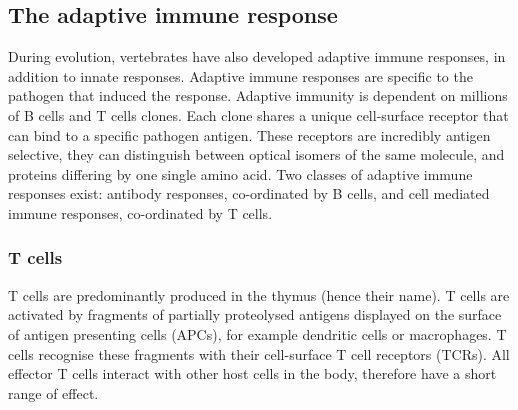 \subsection{The adaptive immune response}
During evolution, vertebrates have also developed adaptive immune responses, in addition to innate responses\cite{hoffmann2013innate}.
Adaptive immune responses are specific to the pathogen that induced the response.
Adaptive immunity is dependent on millions of B cells and T cells clones.
Each clone shares a unique cell-surface receptor that can bind to a specific pathogen antigen.
These receptors are incredibly antigen selective, they can distinguish between optical isomers of the same molecule, and proteins differing by one single amino acid.
Two classes of adaptive immune responses exist: antibody responses, co-ordinated by B cells, and cell mediated immune responses, co-ordinated by T cells\cite{alberts2007molecularimmune}.
%
\subsubsection{T cells}
T cells are predominantly produced in the thymus (hence their name).
T cells are activated by fragments of partially proteolysed antigens displayed on the surface of antigen presenting cells (APCs), for example dendritic cells or macrophages.
T cells recognise these fragments with their cell-surface T cell receptors (TCRs)\@.
All effector T cells interact with other host cells in the body, therefore have a short range of effect\cite{alberts2007molecularimmune}.

